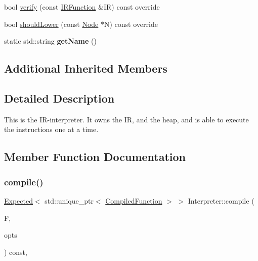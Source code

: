\begin{DoxyCompactItemize}
\item 
bool \hyperlink{classglow_1_1_interpreter_a2e26be458097546c6bbcdaf59e8f493b}{verify} (const \hyperlink{classglow_1_1_i_r_function}{I\+R\+Function} \&IR) const override
\item 
bool \hyperlink{classglow_1_1_interpreter_a4af3e91f6b07d5f896b8db8b4e4d2df4}{should\+Lower} (const \hyperlink{classglow_1_1_node}{Node} $\ast$N) const override
\item 
\mbox{\label{classglow_1_1_interpreter_a23e237c4de5b5c5cb2ce9de9ae51173c}} 
static std\+::string {\bfseries get\+Name} ()
\end{DoxyCompactItemize}
\subsection*{Additional Inherited Members}


\subsection{Detailed Description}
This is the I\+R-\/interpreter. It owns the IR, and the heap, and is able to execute the instructions one at a time. 

\subsection{Member Function Documentation}
\mbox{\label{classglow_1_1_interpreter_a1de9a9294a6ede268ca5b13f980be67e}} 
\subsubsection{\texorpdfstring{compile()}{compile()}}
{\footnotesize\ttfamily \hyperlink{classglow_1_1detail_1_1_glow_expected}{Expected}$<$ std\+::unique\+\_\+ptr$<$ \hyperlink{classglow_1_1_compiled_function}{Compiled\+Function} $>$ $>$ Interpreter\+::compile (\begin{DoxyParamCaption}\item[{\hyperlink{classglow_1_1_function}{Function} $\ast$}]{F,  }\item[{const \hyperlink{structglow_1_1_backend_options}{Backend\+Options} \&}]{opts }\end{DoxyParamCaption}) const\hspace{0.3cm}{\ttfamily [override]}, {\ttfamily [virtual]}}




